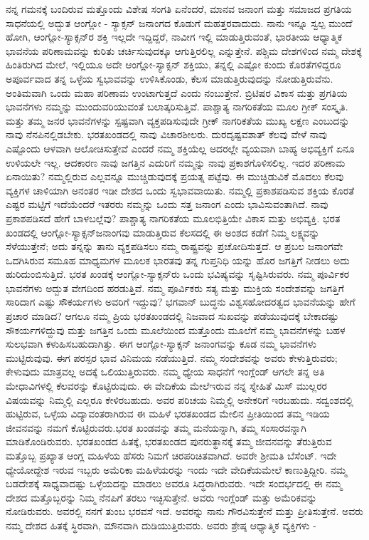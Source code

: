 ನನ್ನ ಗಮನಕ್ಕೆ ಬಂದಿರುವ ಮತ್ತೊಂದು ವಿಶೇಷ ಸಂಗತಿ ಏನೆಂದರೆ, ಮಾನವ ಜನಾಂಗ ಮತ್ತು ಸಮಾಜದ ಪ್ರಗತಿಯ ಸಾಧನೆಯಲ್ಲಿ ಅದ್ಭುತ ಆಂಗ್ಲೋ - ಸ್ಯಾಕ್ಸನ್​ ಜನಾಂಗದ ಕೊಡುಗೆ ಮಹತ್ತರವಾದುದು. ನಾನು ಇನ್ನೂ ಸ್ವಲ್ಪ ಮುಂದೆ ಹೋಗಿ, ಆಂಗ್ಲೋ-ಸ್ಯಾಕ್ಸನ್​ರ ಶಕ್ತಿ ಇಲ್ಲದೇ ಇದ್ದಿದ್ದರೆ, ನಾವೀಗ ಇಲ್ಲಿ ಮಾಡುತ್ತಿರುವಂತೆ, ಭಾರತೀಯ ಆಧ್ಯಾತ್ಮಿಕ ಭಾವನೆಯ ಪರಿಣಾಮವನ್ನು ಕುರಿತು ಚರ್ಚಿಸುವುದಕ್ಕೂ ಆಗುತ್ತಿರಲಿಲ್ಲ ಎನ್ನುತ್ತೇನೆ. ಪಶ್ಚಿಮ ದೇಶಗಳಿಂದ ನಮ್ಮ ದೇಶಕ್ಕೆ ಹಿಂತಿರುಗಿದ ಮೇಲೆ, ಇಲ್ಲಿಯೂ ಅದೇ ಆಂಗ್ಲೋ-ಸ್ಯಾಕ್ಸನ್​ ಶಕ್ತಿಯು, ತನ್ನಲ್ಲಿ ಎಷ್ಟೋ ಕುಂದು ಕೊರತೆಗಳಿದ್ದರೂ ಅಪೂರ್ವವಾದ ತನ್ನ ಒಳ್ಳೆಯ ಸ್ವಭಾವವನ್ನು ಉಳಿಸಿಕೊಂಡು, ಕೆಲಸ ಮಾಡುತ್ತಿರುವುದನ್ನು ನೋಡುತ್ತಿರುವೆನು. ಅಂತಿಮವಾಗಿ ಒಂದು ಮಹಾ ಪರಿಣಾಮ ಉಂಟಾಗುತ್ತದೆ ಎಂದು ನಂಬುತ್ತೇನೆ. ಬ್ರಿಟಿಷರ ವಿಕಾಸ ಮತ್ತು ಪ್ರಗತಿಯ ಭಾವನೆಗಳು ನಮ್ಮನ್ನು ಮುಂದುವರಿಯುವಂತೆ ಬಲಾತ್ಕರಿಸುತ್ತಿವೆ. ಪಾಶ್ಚಾತ್ಯ ನಾಗರಿಕತೆಯ ಮೂಲ ಗ್ರೀಕ್​ ಸಂಸ್ಕೃತಿ. ಮತ್ತು ತಮ್ಮ ಜನರ ಭಾವನೆಗಳನ್ನು ಸ್ಪಷ್ಟವಾಗಿ ವ್ಯಕ್ತಪಡಿಸುವುದೇ ಗ್ರೀಕ್​ ನಾಗರಿಕತೆಯ ಮುಖ್ಯ ಲಕ್ಷಣ ಎಂಬುದನ್ನು ನಾವು ನೆನಪಿನಲ್ಲಿಡಬೇಕು. ಭರತಖಂಡದಲ್ಲಿ ನಾವು ವಿಚಾರಶೀಲರು. ದುರದೃಷ್ಟವಶಾತ್​ ಕೆಲವು ವೇಳೆ ನಾವು ಎಷ್ಟೊಂದು ಆಳವಾಗಿ ಆಲೋಚಿಸುತ್ತೇವೆ ಎಂದರೆ ನಮ್ಮ ಶಕ್ತಿಯೆಲ್ಲ ಅದರಲ್ಲೇ ವ್ಯಯವಾಗಿ ಬಾಹ್ಯ ಅಭಿವ್ಯಕ್ತಿಗೆ ಏನೂ ಉಳಿಯಲೇ ಇಲ್ಲ. ಆದಕಾರಣ ನಾವು ಜಗತ್ತಿನ ಎದುರಿಗೆ ನಮ್ಮನ್ನು ನಾವು ಪ್ರಕಾಶಗೊಳಿಸಲಿಲ್ಲ. ಇದರ ಪರಿಣಾಮ ಏನಾಯಿತು? ನಮ್ಮಲ್ಲಿರುವ ಎಲ್ಲವನ್ನೂ ಮುಚ್ಚಿಡುವುದಕ್ಕೆ ಪ್ರಯತ್ನ ಪಟ್ಟೆವು. ಈ ಮುಚ್ಚಿಡುವಿಕೆ ಮೊದಲು ಕೆಲವು ವ್ಯಕ್ತಿಗಳ ಚಾಳಿಯಾಗಿ ಅನಂತರ ಇಡೀ ದೇಶದ ಒಂದು ಸ್ವಭಾವವಾಯಿತು. ನಮ್ಮಲ್ಲಿ ಪ್ರಕಾಶಪಡಿಸುವ ಶಕ್ತಿಯ ಕೊರತೆ ಎಷ್ಟರ ಮಟ್ಟಿಗೆ ಇದೆಯೆಂದರೆ ಇತರರು ನಮ್ಮನ್ನು ಒಂದು ಸತ್ತ ಜನಾಂಗ ಎಂದು ಭಾವಿಸುವಂತಾಗಿದೆ. ನಾವು ಪ್ರಕಾಶಪಡಿಸದೆ ಹೇಗೆ ಬಾಳಬಲ್ಲೆವು? ಪಾಶ್ಚಾತ್ಯ ನಾಗರಿಕತೆಯ ಮೂಲಭಿತ್ತಿಯೇ ವಿಕಾಸ ಮತ್ತು ಅಭಿವ್ಯಕ್ತಿ. ಭರತ ಖಂಡದಲ್ಲಿ ಆಂಗ್ಲೋ-ಸ್ಯಾಕ್ಸನ್​ ಜನಾಂಗವು ಮಾಡುತ್ತಿರುವ ಕೆಲಸದಲ್ಲಿ ಈ ಅಂಶದ ಕಡೆಗೆ ನಿಮ್ಮ ಲಕ್ಷ್ಯವನ್ನು ಸೆಳೆಯುತ್ತೇನೆ; ಅದು ತನ್ನನ್ನು ತಾನು ವ್ಯಕ್ತಪಡಿಸಲು ನಮ್ಮ ರಾಷ್ಟ್ರವನ್ನು ಪ್ರಚೋದಿಸುತ್ತದೆ. ಆ ಪ್ರಬಲ ಜನಾಂಗವೇ ಒದಗಿಸಿರುವ ಸಮೂಹ ಮಾಧ್ಯಮಗಳ ಮೂಲಕ ಭಾರತವು ತನ್ನ ಗುಪ್ತನಿಧಿ ಯನ್ನು ಹೊರ ಜಗತ್ತಿಗೆ ನೀಡಲು ಅದು ಹುರಿದುಂಬಿಸುತ್ತಿದೆ. ಭರತ ಖಂಡಕ್ಕೆ ಆಂಗ್ಲೋ-ಸ್ಯಾಕ್ಸನ್​ರು ಒಂದು ಭವಿಷ್ಯವನ್ನು ಸೃಷ್ಟಿಸಿರುವರು. ನಮ್ಮ ಪೂರ್ವಿಕರ ಭಾವನೆಗಳು ಅದ್ಬುತ ವೇಗದಿಂದ ಹರಡುತ್ತಿವೆ. ನಮ್ಮ ಪೂರ್ವಿಕರು ಸತ್ಯ ಮತ್ತು ಮುಕ್ತಿಯ ಸಂದೇಶವನ್ನು ಜಗತ್ತಿಗೆ ಸಾರಿದಾಗ ಎಷ್ಟು ಸೌಕರ್ಯಗಳು ಅವರಿಗೆ ಇದ್ದುವು? ಭಗವಾನ್​ ಬುದ್ಧನು ವಿಶ್ವಸಹೋದರತ್ವದ ಭಾವನೆಯನ್ನು ಹೇಗೆ ಪ್ರಚಾರ ಮಾಡಿದ? ಆಗಲೂ ನಮ್ಮ ಪ್ರಿಯ ಭರತಖಂಡದಲ್ಲಿ ನಿಜವಾದ ಸುಖವನ್ನು ಪಡೆಯುವುದಕ್ಕೆ ಬೇಕಾದಷ್ಟು ಸೌಕರ್ಯಗಳಿದ್ದುವು ಮತ್ತು ಜಗತ್ತಿನ ಒಂದು ಮೂಲೆಯಿಂದ ಮತ್ತೊಂದು ಮೂಲೆಗೆ ನಮ್ಮ ಭಾವನೆಗಳನ್ನು ಬಹಳ ಸುಲಭವಾಗಿ ಕಳುಹಿಸಬಹುದಾಗಿತ್ತು. ಈಗ ಆಂಗ್ಲೋ-ಸ್ಯಾಕ್ಸನ್​ ಜನಾಂಗವನ್ನು ಕೂಡ ನಮ್ಮ ಭಾವನೆಗಳು ಮುಟ್ಟಿರುವುವು. ಈಗ ಪರಸ್ಪರ ಭಾವ ವಿನಿಮಯ ನಡೆಯುತ್ತಿದೆ. ನಮ್ಮ ಸಂದೇಶವನ್ನು ಅವರು ಕೇಳುತ್ತಿರುವರು; ಕೇಳುವುದು ಮಾತ್ರವಲ್ಲ ಅದಕ್ಕೆ ಒಲಿಯುತ್ತಿರುವರು. ನಮ್ಮ ಧ್ಯೇಯ ಸಾಧನೆಗೆ ಇಂಗ್ಲೆಂಡ್​ ಆಗಲೇ ತನ್ನ ಅತಿ ಮೇಧಾವಿಗಳಲ್ಲಿ ಕೆಲವರನ್ನು ಕೊಟ್ಟಿರುವುದು. ಈ ವೇದಿಕೆಯ ಮೇಲೆ\break ಇರುವ ನನ್ನ ಸ್ನೇಹಿತೆ ಮಿಸ್​ ಮುಲ್ಲರರ ವಿಷಯವನ್ನು ನಿಮ್ಮಲ್ಲಿ ಎಲ್ಲರೂ ಕೇಳಿರ\-ಬಹುದು. ಅವರ ಪರಿಚಯ ನಿಮ್ಮಲ್ಲಿ ಅನೇಕರಿಗೆ ಇರಬಹುದು. ಸದ್ವಂಶದಲ್ಲಿ ಹುಟ್ಟಿರುವ, ಒಳ್ಳೆಯ ವಿದ್ಯಾವಂತರಾಗಿರುವ ಈ ಮಹಿಳೆ ಭರತಖಂಡದ ಮೇಲಿನ ಪ್ರೀತಿಯಿಂದ ತಮ್ಮ ಇಡಿಯ ಜೀವನವನ್ನು ನಮಗೆ ಕೊಟ್ಟಿರುವರು.\break ಭರತ ಖಂಡವನ್ನು ತಮ್ಮ ಮನೆಯನ್ನಾಗಿ, ತಮ್ಮ ಸಂಸಾರವನ್ನಾಗಿ ಮಾಡಿ\-ಕೊಂಡಿರುವರು. ಭರತಖಂಡದ ಹಿತಕ್ಕೆ, ಭರತಖಂಡದ ಪುನರುತ್ಥಾನಕ್ಕೆ ತಮ್ಮ ಜೀವನವನ್ನು ತೆರುತ್ತಿರುವ ಮತ್ತೊಬ್ಬ ಪ್ರಖ್ಯಾತ ಆಂಗ್ಲ ಮಹಿಳೆಯ ಹೆಸರು ನಿಮಗೆ ಚಿರಪರಿಚಿತವಾಗಿದೆ. ಅವರೇ ಶ‍್ರೀಮತಿ ಬೆಸೆಂಟ್​. ಇದೇ ಧ್ಯೇಯೋದ್ದೇಶ ಇರುವ ಇಬ್ಬರು ಅಮೆರಿಕಾ ಮಹಿಳೆಯರನ್ನು ಇಂದು ಇದೇ ವೇದಿಕೆಯ\break ಮೇಲೆ ಕಾಣುತ್ತಿದ್ದೀರಿ. ನಮ್ಮ ಬಡದೇಶಕ್ಕೆ ಸಾಧ್ಯವಾದಷ್ಟು ಒಳ್ಳೆಯದನ್ನು ಮಾಡಲು ಅವರೂ ಸಿದ್ಧರಾಗಿರುವರು. ಇದೇ ಸಂದರ್ಭದಲ್ಲಿ ಈ ನಮ್ಮ ದೇಶದ ಮತ್ತೊಬ್ಬರನ್ನು ನಿಮ್ಮ ನೆನಪಿಗೆ ತರಲು ಇಚ್ಛಿಸುತ್ತೇನೆ. ಅವರು ಇಂಗ್ಲೆಂಡ್​ ಮತ್ತು ಅಮೆರಿಕವನ್ನು ನೋಡಿರುವರು. ಅವರಲ್ಲಿ ನನಗೆ ತುಂಬ ಭರವಸೆ ಇದೆ. ಅವರನ್ನು ನಾನು ಗೌರವಿಸುತ್ತೇನೆ ಮತ್ತು ಪ್ರೀತಿಸುತ್ತೇನೆ. ಅವರು ನಮ್ಮ ದೇಶದ ಹಿತಕ್ಕೆ ಸ್ಥಿರವಾಗಿ, ಮೌನವಾಗಿ ದುಡಿಯುತ್ತಿರುವರು. ಅವರು ಶ್ರೇಷ್ಠ ಆಧ್ಯಾತ್ಮಿಕ ವ್ಯಕ್ತಿಗಳು - 
